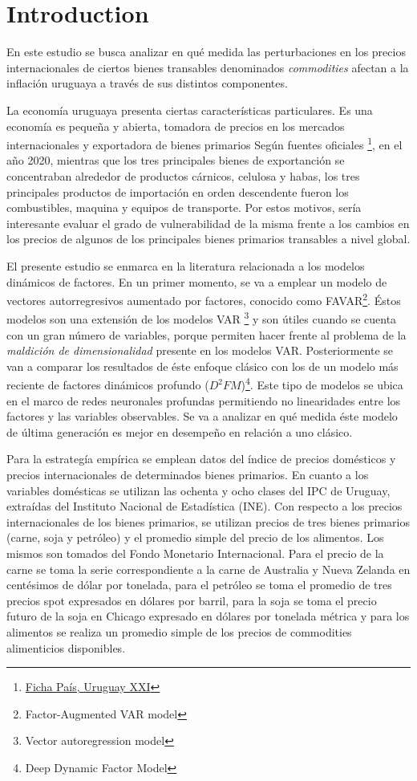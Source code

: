 \chapter{Introduction}


En este estudio se busca analizar en qué medida las perturbaciones en los precios internacionales de ciertos bienes transables denominados \textit{commodities} afectan a la inflación uruguaya a través de sus distintos componentes. 

La economía uruguaya presenta ciertas características particulares. Es una economía es pequeña y abierta, tomadora de precios en los mercados internacionales y exportadora de bienes primarios  Según fuentes oficiales \footnote{\href{https://fichapais.uruguayxxi.gub.uy/}{Ficha País, Uruguay XXI}}, en el año 2020, mientras que los tres principales bienes de exportanción se concentraban alrededor de productos cárnicos, celulosa y habas, los tres principales productos de importación en orden descendente fueron los combustibles, maquina y equipos de transporte. Por estos motivos,  sería interesante evaluar el grado de vulnerabilidad de la misma frente a los cambios en los precios de algunos de los principales bienes primarios transables a nivel global.


El presente estudio se enmarca en la literatura relacionada a los modelos dinámicos de factores. En un primer momento, se va a emplear un modelo de vectores autorregresivos aumentado por factores, conocido como FAVAR\footnote{ Factor-Augmented VAR model}. Éstos modelos son una extensión de los modelos VAR \footnote{ Vector autoregression model} 
y son útiles cuando se cuenta con un gran número de variables, porque permiten hacer frente al problema de la \textit{maldición de dimensionalidad} presente en los modelos VAR. Posteriormente se van a comparar los resultados de éste enfoque clásico con los de un modelo más reciente de factores dinámicos profundo ($D^2FM$)\footnote{Deep Dynamic Factor Model}. Este tipo de modelos se ubica en el marco de redes neuronales profundas permitiendo no linearidades entre los factores y las variables observables. Se va a analizar en qué medida éste modelo de última generación es mejor en desempeño en relación a uno clásico.

Para la estrategía empírica se emplean datos del índice de precios domésticos y precios internacionales de determinados bienes primarios. En cuanto a los variables domésticas se utilizan las ochenta y ocho clases del IPC de Uruguay, extraídas del Instituto Nacional de Estadística (INE).  Con respecto a los precios internacionales de los bienes primarios, se utilizan precios de tres bienes primarios (carne, soja y petróleo) y el promedio simple del precio de los alimentos. Los mismos son tomados del Fondo Monetario Internacional. Para el precio de la carne se toma la serie correspondiente a la carne de Australia y Nueva Zelanda en centésimos de dólar por tonelada, para el petróleo se toma el promedio de tres precios spot expresados en dólares por barril, para la soja
se toma el precio futuro de la soja en Chicago expresado en dólares por tonelada
métrica  y para los alimentos se realiza un promedio simple de los precios de commodities alimenticios disponibles. 